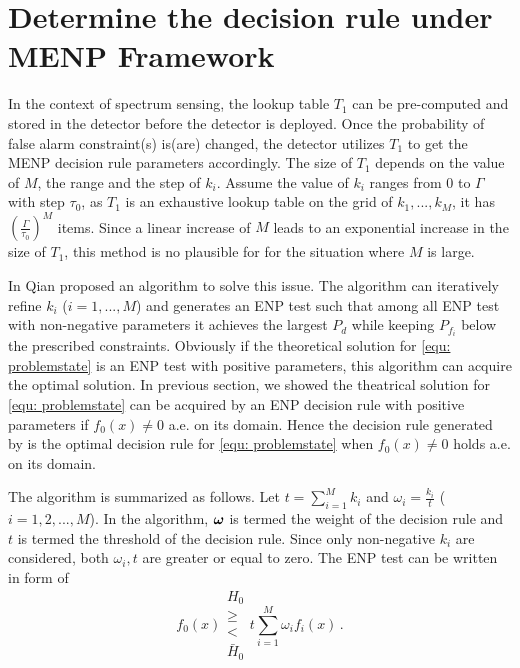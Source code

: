 
\section{Determine the decision rule under MENP Framework}
In the context of spectrum sensing, the lookup table $T_1$ can be pre-computed and stored in the detector before the detector is deployed. Once the probability of false alarm constraint(s) is(are) changed, the detector utilizes $T_1$ to get the MENP decision  rule parameters accordingly. The size of $T_1$ depends on the value of $M$, the range and the step of $k_i$.  Assume the value of $k_i$ ranges from $0$ to $\Gamma$ with step $\tau_0$, as $T_1$ is an exhaustive lookup table on the grid of $k_1, ..., k_M$, it has $(\frac{\Gamma}{\tau_0})^M$ items. Since a linear increase of $M$ leads to an exponential increase in the size of $T_1$, this method is no plausible for for the situation where $M$ is large. 

In \cite{zhang1999design, zhang2000efficient} Qian proposed an algorithm to solve this issue.  The algorithm can iteratively refine $k_i$ ($i=1, ..., M$) and generates an ENP test  such that among all ENP test with non-negative parameters it achieves the largest $P_d$ while keeping $P_{f_i}$ below the prescribed constraints. 
Obviously if the theoretical solution for \eqref{equ: problemstate} is an ENP test with positive parameters, this algorithm can acquire the optimal solution. 
In previous section, we showed the theatrical solution for \eqref{equ: problemstate} can be acquired by an ENP decision rule with positive parameters if $f_0(x) \neq 0$ a.e. on its domain. 
Hence the decision rule generated by \cite{zhang1999design, zhang2000efficient} is the optimal decision rule for \eqref{equ: problemstate} when $f_0(x) \neq 0$ holds a.e. on its domain.

The algorithm is summarized as follows. Let $t = \sum_{i=1}^{M}k_i$ and $\omega_i = \frac{k_i}{t}$ ($i=1, 2, ..., M$). In the algorithm, $\boldsymbol{\omega}$ is termed the weight of the decision rule and $t$ is termed the threshold of the decision rule. Since only non-negative $k_i$ are considered, both $\omega_i, t$ are greater or equal to zero. The ENP test can be written in form of 
\begin{equation}
\label{qian dec}
f_0(x) \substack{H_0 \\ \geq \\ < \\ \bar{H}_0} t\sum_{i=1}^{M}\omega_if_i(x)\,.
\end{equation}

